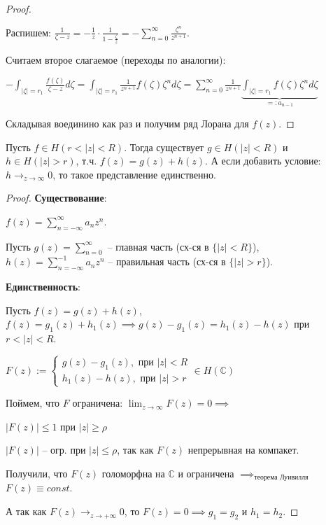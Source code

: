 \begin{proof}
\begin{enumerate}
{            Распишем: $\frac{1}{\zeta - z} = -\frac{1}{z} \cdot \frac{1}{1 - \frac{\zeta}{z}} = -\sum_{n = 0}^{\infty} \frac{\zeta^n}{z^{n + 1}}$.

            Считаем второе слагаемое (переходы по аналогии):

            $-\int_{|\zeta| = r_1} { \frac{f(\zeta)}{\zeta - z} d\zeta } = \int_{|\zeta| = r_1} { \frac{1}{z^{n + 1}} f(\zeta) \zeta^n d\zeta } = \sum_{n=0}^{\infty} \frac{1}{z^{n+1}} \underbrace{\int_{|\zeta| = r_1}{f(\zeta) \zeta^n d\zeta}}_{=: a_{n-1}}$
        }
    \end{enumerate}

    Складывая воединино как раз и получим ряд Лорана для $f(z)$.
\end{proof}

\begin{theorem}
    Пусть $f \in H(r < |z| < R)$. Тогда существует $g \in H(|z| < R)$ и $h \in H(|z| > r)$, т.ч. $f(z) = g(z) + h(z)$. А если добавить условие: $h \rightarrow_{z \rightarrow \infty} 0$, то такое представление единственно.
\end{theorem}

\begin{proof}
    \textbf{Существование}:

    $f(z) = \sum_{n=-\infty}^{\infty} a_n z^n$.

    Пусть $g(z) = \sum_{n = 0}^{\infty}$ -- главная часть (сх-ся в $\{ |z| < R \}$), $h(z) = \sum_{n = -\infty}^{-1} a_n z^n$ -- правильная часть (сх-ся в $\{ |z| > r \}$).

    \textbf{Единственность}:

    Пусть $f(z) = g(z) + h(z)$, $f(z) = g_1(z) + h_1(z) \implies g(z) - g_1(z) = h_1(z) - h(z)$ при $r < |z| < R$.

    $F(z) := \begin{cases}
        g(z) - g_1(z), \text{ при } |z| < R \\
        h_1(z) - h(z), \text{ при } |z| > r
    \end{cases} \in H(\mathbb{C})$

    Поймем, что $F$ ограничена: $\lim_{z\rightarrow \infty} {F(z)} = 0 \implies$

    $|F(z)| \leq 1$ при $|z| \geq \rho$

    $|F(z)|$ -- огр. при $|z| \leq \rho$, так как $F(z)$ непрерывная на компакет.

    Получили, что $F(z)$ голоморфна на $\mathbb{C}$ и ограничена $\implies_{\text{теорема Луивилля}}$ $F(z) \equiv const$.

    А так как $F(z) \rightarrow_{z \rightarrow +\infty} 0$, то $F(z) = 0 \implies g_1 = g_2$ и $h_1 = h_2$.
\end{proof}

